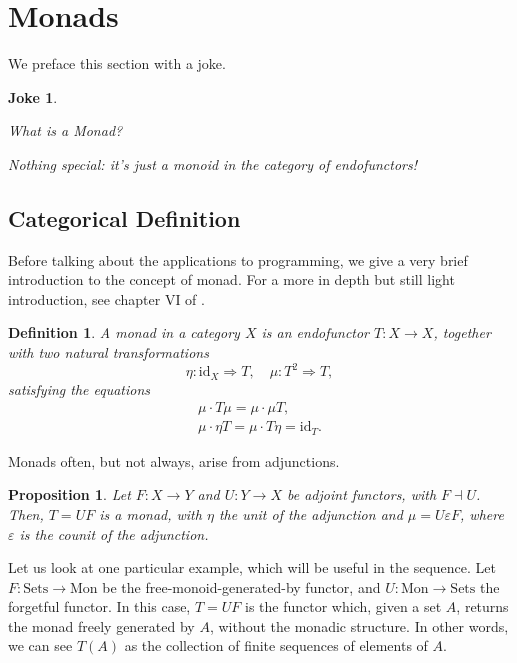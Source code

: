 \documentclass[11pt]{article}
\newtheorem{prop}{Proposition}
\newtheorem{definition}{Definition}
\newtheorem{joke}{Joke}
\theoremstyle{nonumberplain}
\newcommand{\cat}[1]{\mathrm{#1}}
\newcommand{\id}{\mathrm{id}}
\newcommand{\nto}{\Rightarrow}
\begin{document}
\section{Monads}\label{sec:monads}

We preface this section with a joke.

\begin{joke}
\leavevmode
\begin{description}[labelindent=\parindent]
\item[Novice learning Haskell:] What is a Monad?

\item[Haskell expert:] Nothing special: it's just a monoid in the category of endofunctors!
\end{description}
\end{joke}

\subsection{Categorical Definition}

Before talking about the applications to programming, we give a very brief introduction to the concept of monad. For a more in depth but still light introduction, see chapter VI of \cite{maclane}.

\begin{definition}\label{def:monad}
A monad in a category $X$ is an endofunctor $T \colon X \to X$, together with two natural transformations
\begin{equation}
\eta \colon \id_X \nto T, \quad \mu \colon T^2 \nto T,
\end{equation}
satisfying the equations
\begin{gather}
\mu \cdot T\mu = \mu \cdot \mu T,\\
\mu \cdot \eta T = \mu \cdot T \eta = \id_T.
\end{gather}
\end{definition}

Monads often, but not always, arise from adjunctions.

\begin{prop}\label{prop:monadj}
Let $F \colon X \to Y$ and $U \colon Y \to X$ be adjoint functors, with $F \dashv U$. Then, $T = UF$ is a monad, with $\eta$ the unit of the adjunction and $\mu = U \varepsilon F$, where $\varepsilon$ is the counit of the adjunction.
\end{prop}

Let us look at one particular example, which will be useful in the sequence. Let $F \colon \cat{Sets} \to \cat{Mon}$ be the free-monoid-generated-by functor, and $U \colon \cat{Mon} \to \cat{Sets}$ the forgetful functor. In this case, $T = UF$ is the functor which, given a set $A$, returns the monad freely generated by $A$, without the monadic structure. In other words, we can see $T(A)$ as the collection of finite sequences of elements of $A$.
\end{document}
